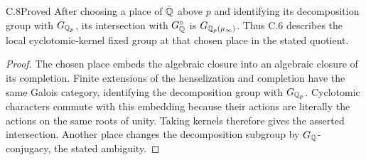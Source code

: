 \begin{claim}{C.8}{Proved}
After choosing a place of $\bar{\mathbb Q}$ above $p$ and identifying its decomposition
group with $G_{\mathbb Q_p}$, its intersection with $G_\mathbb Q^\circ$ is
$G_{\mathbb Q_p(\mu_\infty)}$. Thus C.6 describes the local cyclotomic-kernel fixed
group at that chosen place in the stated quotient.
\end{claim}
\begin{proof}
The chosen place embeds the algebraic closure into an algebraic closure of
its completion. Finite extensions of the henselization and completion
have the same Galois category, identifying the decomposition group with
$G_{\mathbb Q_p}$. Cyclotomic characters commute with this embedding because
their actions are literally the actions on the same roots of unity.
Taking kernels therefore gives the asserted intersection. Another place
changes the decomposition subgroup by $G_\mathbb Q$-conjugacy, the stated ambiguity.
\end{proof}

